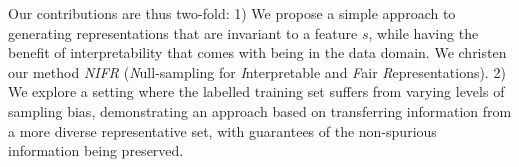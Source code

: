 

Our contributions are thus two-fold: 
%
1) We propose a simple approach to generating representations that are invariant to a feature $s$,
while having the benefit of interpretability that comes with being in the data domain. We christen
our method \emph{NIFR} (\emph{N}ull-sampling for \emph{I}nterpretable and \emph{F}air
\emph{R}epresentations).
%
2) We explore a setting where the labelled training set suffers from varying levels of sampling
bias, demonstrating an approach based on transferring information from a more diverse
representative set, with guarantees of the non-spurious information being preserved.
